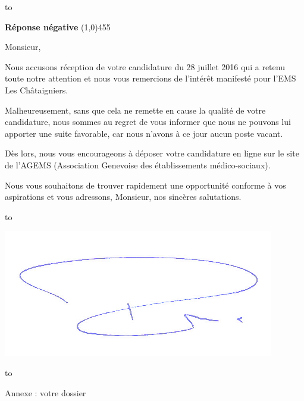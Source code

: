 \documentclass[a4paper, 12pt]{letter}
\begin{document}


\hbox to 

\bigbreak



\begin{flushleft}
\textbf{Réponse négative}
\line(1,0){455}
\end{flushleft}
\bigbreak
Monsieur,

Nous accusons réception de votre candidature du 28 juillet 2016 qui a retenu toute notre attention et nous vous remercions de l’intérêt manifesté pour l’EMS Les Châtaigniers.

Malheureusement, sans que cela ne remette en cause la qualité de votre candidature, nous sommes au regret de vous informer que nous ne pouvons lui apporter une suite favorable, car nous n’avons à ce jour aucun poste vacant.

Dès lors, nous vous encourageons à déposer votre candidature en ligne sur le site de l’AGEMS (Association Genevoise des établissements médico-sociaux).

Nous vous souhaitons de trouver rapidement une opportunité conforme à vos aspirations et vous adressons, Monsieur, nos sincères salutations.

\bigbreak
\bigbreak
\bigbreak
\bigbreak

\hbox to 

\begin{flushright}
		\includegraphics{sign.png}
		\end{flushright}

\hbox to 

\bigbreak
\bigbreak

Annexe : votre dossier
\end{document}

